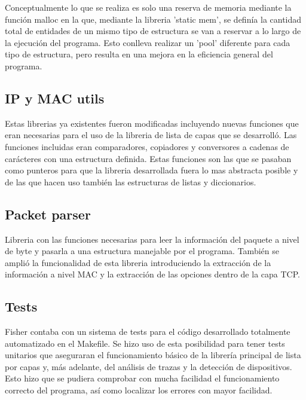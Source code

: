 \documentclass[twoside, 12pt]{epstfg}
\begin{document}
Conceptualmente lo que se realiza es solo una reserva de memoria mediante la función malloc en la que, mediante la libreria 'static mem', se definía la cantidad total de entidades de un mismo tipo de estructura se van a reservar a lo largo de la ejecución del programa. Esto conlleva realizar un 'pool' diferente para cada tipo de estructura, pero resulta en una mejora en la eficiencia general del programa. 
\subsection{IP y MAC utils}
Estas librerias ya existentes fueron modificadas incluyendo nuevas funciones que eran necesarias para el uso de la libreria de lista de capas que se desarrolló. Las funciones incluidas eran comparadores, copiadores y conversores a cadenas de carácteres con una estructura definida. Estas funciones son las que se pasaban como punteros para que la libreria desarrollada fuera lo mas abstracta posible y de las que hacen uso también las estructuras de listas y diccionarios.
\subsection{Packet parser}
Libreria con las funciones necesarias para leer la información del paquete a nivel de byte y pasarla a una estructura manejable por el programa. También se amplió la funcionalidad de esta libreria introduciendo la extracción de la información a nivel MAC y la extracción de las opciones dentro de la capa TCP.
\subsection{Tests}
Fisher contaba con un sistema de tests para el código desarrollado totalmente automatizado en el Makefile. Se hizo uso de esta posibilidad para tener tests unitarios que aseguraran el funcionamiento básico de la librería principal de lista por capas y, más adelante, del análisis de trazas y la detección de dispositivos. Esto hizo que se pudiera comprobar con mucha facilidad el funcionamiento correcto del programa, así como localizar los errores con mayor facilidad.
\end{document}
